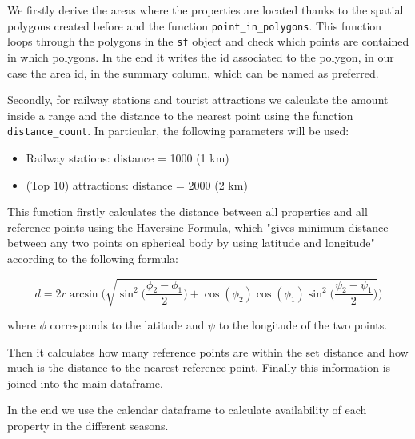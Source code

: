 We firstly derive the areas where the properties are located thanks to the spatial polygons created before and the function \texttt{point\_in\_polygons}.
This function loops through the polygons in the \texttt{sf} object and check which points are contained in which polygons. In the end it writes the id associated to the polygon, in our case the area id, in the summary column, which can be named as preferred.



Secondly, for railway stations and tourist attractions we calculate the amount inside a range and the distance to the nearest point using the function \texttt{distance\_count}. In particular, the following parameters will be used:

\begin{itemize}

    \item Railway stations: distance = 1000 (1 km)

    \item (Top 10) attractions: distance = 2000 (2 km)
    
\end{itemize}

This function firstly calculates the distance between all properties and all reference points using the Haversine Formula, which "gives  minimum  distance  between  any  two  points  on  spherical body by using latitude and longitude" \citep{ingole2013landmark} according to the following formula:

\begin{equation}
d = 2r \arcsin \Bigg(\sqrt{\sin^2\Big(\frac{\phi_2 - \phi_1}{2}\Big) + \cos(\phi_2)\cos(\phi_1)\sin^2\Big(\frac{\psi_2 - \psi_1}{2}\Big)}\Bigg)
\end{equation}

where $\phi$ corresponds to the latitude and $\psi$ to the longitude of the two points.

Then it calculates how many reference points are within the set distance and how much is the distance to the nearest reference point. Finally this information is joined into the main dataframe.



In the end we use the calendar dataframe to calculate availability of each property in the different seasons.

